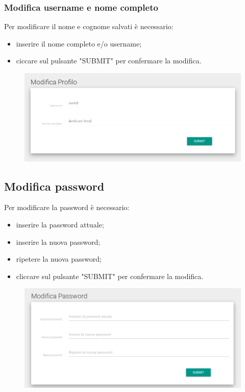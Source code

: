 \documentclass[12pt,a4paper]{article}
\begin{document}
	\subsubsection{Modifica username e nome completo}
	Per modificare il nome e cognome salvati è necessario:
	\begin{itemize}
		\item inserire il nome completo e/o username;
		\item ciccare sul pulsante "SUBMIT" per confermare la modifica.
	\end{itemize}
	\begin{figure}[h]
		
		\centering
		\includegraphics[width=1.0\linewidth]{../img/screenshot/user1.png}
		\caption{}
		\label{Modifica profilo}
	\end{figure}

	
	\subsection{Modifica password}
	Per modificare la password  è necessario:
	\begin{itemize}
		\item inserire la password attuale;
		\item inserire la nuova password;
		\item ripetere la nuova password;
		\item cliccare sul pulsante "SUBMIT" per confermare la modifica.
	\end{itemize}
	\begin{figure}[h]

		\centering
		\includegraphics[width=1.0\linewidth]{../img/screenshot/user2.png}
		\caption{}
		\label{Modifica password}
	\end{figure}
	
\end{document}
